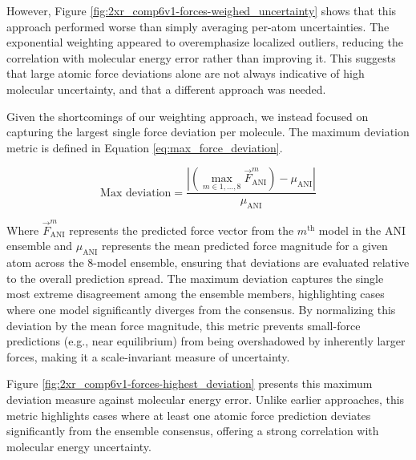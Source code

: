 However, Figure \ref{fig:2xr_comp6v1-forces-weighed_uncertainty} shows that this approach performed worse than simply averaging per-atom uncertainties. The exponential weighting appeared to overemphasize localized outliers, reducing the correlation with molecular energy error rather than improving it. This suggests that large atomic force deviations alone are not always indicative of high molecular uncertainty, and that a different approach was needed.

Given the shortcomings of our weighting approach, we instead focused on capturing the largest single force deviation per molecule. The maximum deviation metric is defined in Equation \ref{eq:max_force_deviation}.

\begin{equation} 
\text{Max deviation} = 
\frac{\left| \left(\max\limits_{m \in {1, \dots, 8}} \vec{F}_{\text{ANI}}^m \right)- \mu_{\text{ANI}} \right|}{\mu_{\text{ANI}}} 
\label{eq:max_force_deviation}
\end{equation}

Where $\vec{F}_{\text{ANI}}^m$ represents the predicted force vector from the $m^{\text{th}}$ model in the ANI ensemble and $\mu_{\text{ANI}}$ represents the mean predicted force magnitude for a given atom across the 8-model ensemble, ensuring that deviations are evaluated relative to the overall prediction spread. The maximum deviation captures the single most extreme disagreement among the ensemble members, highlighting cases where one model significantly diverges from the consensus. By normalizing this deviation by the mean force magnitude, this metric prevents small-force predictions (e.g., near equilibrium) from being overshadowed by inherently larger forces, making it a scale-invariant measure of uncertainty.

Figure \ref{fig:2xr_comp6v1-forces-highest_deviation} presents this maximum deviation measure against molecular energy error. Unlike earlier approaches, this metric highlights cases where at least one atomic force prediction deviates significantly from the ensemble consensus, offering a strong correlation with molecular energy uncertainty.

